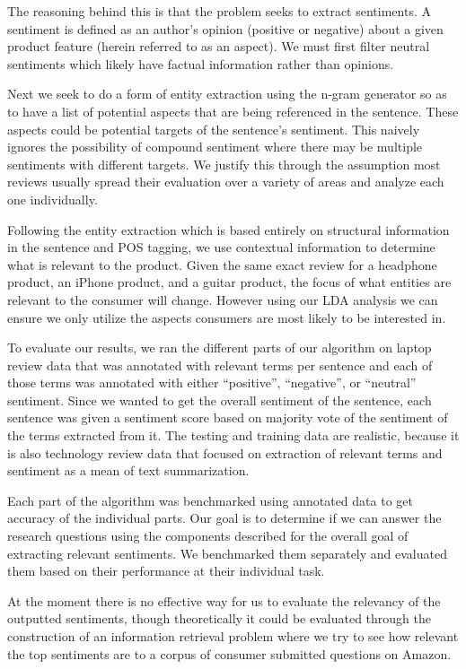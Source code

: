 \documentclass{article}
\begin{document}
The reasoning behind this is that the problem seeks to extract sentiments. A sentiment is defined as an author’s opinion (positive or negative) about a given product feature (herein referred to as an aspect). We must first filter neutral sentiments which likely have factual information rather than opinions.

Next we seek to do a form of entity extraction using the n-gram generator so as to have a list of potential aspects that are being referenced in the sentence. These aspects could be potential targets of the sentence’s sentiment. This naively ignores the possibility of compound sentiment where there may be multiple sentiments with different targets. We justify this through the assumption most reviews usually spread their evaluation over a variety of areas and analyze each one individually.

Following the entity extraction which is based entirely on structural information in the sentence and POS tagging, we use contextual information to determine what is relevant to the product. Given the same exact review for a headphone product, an iPhone product, and a guitar product, the focus of what entities are relevant to the consumer will change. However using our LDA analysis we can ensure we only utilize the aspects consumers are most likely to be interested in.

To evaluate our results, we ran the different parts of our algorithm on laptop review data that was annotated with relevant terms per sentence and each of those terms was annotated with either “positive”, “negative”, or “neutral” sentiment. Since we wanted to get the overall sentiment of the sentence, each sentence was given a sentiment score based on majority vote of the sentiment of the terms extracted from it. The testing and training data are realistic, because it is also technology review data that focused on extraction of relevant terms and sentiment as a mean of text summarization. 

Each part of the algorithm was benchmarked using annotated data to get accuracy of the individual parts. Our goal is to determine if we can answer the research questions using the components described for the overall goal of extracting relevant sentiments. We benchmarked them separately and evaluated them based on their performance at their individual task.

At the moment there is no effective way for us to evaluate the relevancy of the outputted sentiments, though theoretically it could be evaluated through the construction of an information retrieval problem where we try to see how relevant the top sentiments are to a corpus of consumer submitted questions on Amazon.
\end{document}

